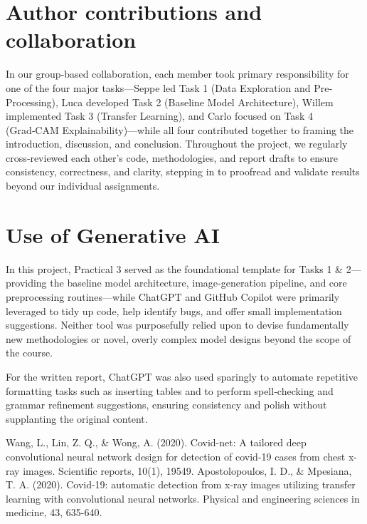 \documentclass[conference]{IEEEtran}
\begin{document}
\section{Author contributions and collaboration}
In our group‐based collaboration, each member took primary responsibility for one of the four major tasks—Seppe led Task 1 (Data Exploration and Pre‐Processing), Luca developed Task 2 (Baseline Model Architecture), Willem implemented Task 3 (Transfer Learning), and Carlo focused on Task 4 (Grad‑CAM Explainability)—while all four contributed together to framing the introduction, discussion, and conclusion. Throughout the project, we regularly cross‐reviewed each other’s code, methodologies, and report drafts to ensure consistency, correctness, and clarity, stepping in to proofread and validate results beyond our individual assignments.

\section{Use of Generative AI}
In this project, Practical 3 served as the foundational template for Tasks 1 \& 2—providing the baseline model architecture, image‐generation pipeline, and core preprocessing routines—while ChatGPT and GitHub Copilot were primarily leveraged to tidy up code, help identify bugs, and offer small implementation suggestions. Neither tool was purposefully relied upon to devise fundamentally new methodologies or novel, overly complex model designs beyond the scope of the course.

For the written report, ChatGPT was also used sparingly to automate repetitive formatting tasks such as inserting tables and to perform spell‑checking and grammar refinement suggestions, ensuring consistency and polish without supplanting the original content.

\begin{thebibliography}{00}
	 Wang, L., Lin, Z. Q., \& Wong, A. (2020). Covid-net: A tailored deep convolutional neural network design for detection of covid-19 cases from chest x-ray images. Scientific reports, 10(1), 19549.
	 Apostolopoulos, I. D., \& Mpesiana, T. A. (2020). Covid-19: automatic detection from x-ray images utilizing transfer learning with convolutional neural networks. Physical and engineering sciences in medicine, 43, 635-640.
\end{thebibliography}
\end{document}
